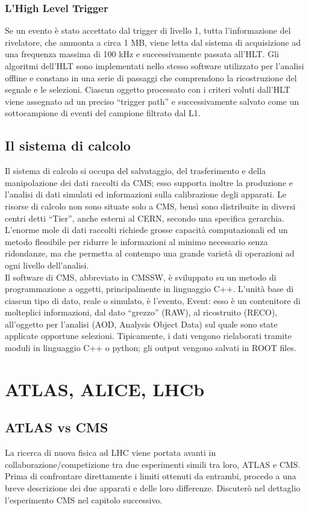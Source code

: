 \subsubsection{L'High Level Trigger}
Se un evento \`e stato accettato dal trigger di livello 1, tutta l'informazione del rivelatore, che ammonta a circa 1 MB, viene letta dal sistema di acquisizione ad una frequenza massima di 100 kHz e successivamente passata all'HLT. Gli algoritmi dell'HLT sono implementati nello stesso software utilizzato per l'analisi offline e constano in una serie di passaggi che comprendono la ricostruzione del segnale e le selezioni. Ciascun oggetto processato con i criteri voluti dall'HLT viene assegnato ad un preciso ``trigger path'' e successivamente salvato come un sottocampione di eventi del campione filtrato dal L1.
\subsection{Il sistema di calcolo}
Il sistema di calcolo si occupa del salvataggio, del trasferimento e della manipolazione dei dati raccolti da CMS; esso supporta inoltre la produzione e l'analisi di dati simulati ed informazioni sulla calibrazione degli apparati. Le risorse di calcolo non sono situate solo a CMS, bens\`i sono distribuite in diversi centri detti ``Tier'', anche esterni al CERN, secondo una specifica gerarchia. L'enorme mole di dati raccolti richiede grosse capacit\`a computazionali ed un metodo flessibile per ridurre le informazioni al minimo necessario senza ridondanze, ma che permetta al contempo una grande variet\`a di operazioni ad ogni livello dell'analisi.\\
Il software di CMS, abbreviato in CMSSW, \`e sviluppato su un metodo di programmazione a oggetti, principalmente in linguaggio C++. L'unit\`a base di ciascun tipo di dato, reale o simulato, \`e l'evento, Event: esso \`e un contenitore di molteplici informazioni, dal dato ``grezzo'' (RAW), al ricostruito (RECO), all'oggetto per l'analisi (AOD, Analysis Object Data) sul quale sono state applicate opportune selezioni. Tipicamente, i dati vengono rielaborati tramite moduli in linguaggio C++ o python; gli output vengono salvati in ROOT files.\\

\section{ATLAS, ALICE, LHCb}

\subsection{ATLAS vs CMS}
La ricerca di nuova fisica ad LHC viene portata avanti in collaborazione/competizione tra due esperimenti simili tra loro, ATLAS e CMS. Prima di confrontare direttamente i limiti ottenuti da entrambi, procedo a una breve descrizione dei due apparati e delle loro differenze. Discuter\`o nel dettaglio l'esperimento CMS nel capitolo successivo.

